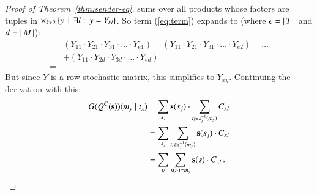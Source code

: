 \begin{proof}[Proof of Theorem~\ref{thm:sender-eq}]
  sums over all products whose factors are tuples in $\times_{k>2}
  \left\{y \thinspace \mid \thinspace \exists l \thinspace \colon \thinspace y = Y_{kl}\right\}$. So term
  (\ref{eq:term}) expands to (where $e = \left \lvert \, T \, \right\rvert$ and $d=\left \lvert \, M \, \right\rvert$):
  \begin{align*}
    & (Y_{11} \cdot Y_{21} \cdot Y_{31} \cdot \ldots \cdot Y_{e1}) +
    (Y_{11} \cdot Y_{21} \cdot Y_{31} \cdot \ldots \cdot Y_{e2}) + 
    \dots \\
    & + (Y_{11} \cdot Y_{2d} \cdot
    Y_{3d} \cdot \ldots \cdot
    Y_{ed})\\
    = &    
  \end{align*}
  But since $Y$ is a row-stochastic matrix, this simplifies to
  $Y_{xy}$. Continuing the derivation with this:
  \begin{align*}
    G(Q^C(\mathrm{\mathbf{s}}))(m_y \mid t_x) 
    & = \sum_{s_j} \mathrm{\mathbf{s}}(s_j) \cdot
    \sum_{t_l \in s_j^{-1}(m_y)} C_{xl} \\
    & = \sum_{s_j} \sum_{t_l \in s_j^{-1}(m_y)} \mathrm{\mathbf{s}}(s_j) \cdot
     C_{xl} \\
     & = \sum_{t_l}
    \sum_{s(t_l) = m_y} \mathrm{\mathbf{s}}(s) \cdot C_{xl}\,.
  \end{align*}

\end{proof}

